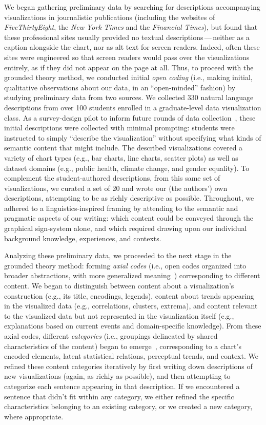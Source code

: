 We began gathering preliminary data by searching for descriptions accompanying visualizations in journalistic publications (including the websites of \emph{FiveThirtyEight}, the \emph{New York Times} and the \emph{Financial Times}), but found that these professional sites usually provided no textual descriptions\,---\,neither as a caption alongside the chart, nor as alt text for screen readers.
Indeed, often these sites were engineered so that screen readers would pass over the visualizations entirely, as if they did not appear on the page at all.
Thus, to proceed with the grounded theory method, we conducted initial \emph{open coding} (i.e., making initial, qualitative observations about our data, in an  ``open-minded'' fashion) by studying preliminary data from two sources.
We collected 330 natural language descriptions from over 100 students enrolled in a graduate-level data visualization class.
As a survey-design pilot to inform future rounds of data collection~, these initial descriptions were collected with minimal prompting: students were instructed to simply ``describe the visualization'' without specifying what kinds of semantic content that might include.
The described visualizations covered a variety of chart types (e.g., bar charts, line charts, scatter plots) as well as dataset domains (e.g., public health, climate change, and gender equality).
To complement the student-authored descriptions, from this same set of visualizations, we curated a set of 20 and wrote our (the authors') own descriptions, attempting to be as richly descriptive as possible.
Throughout, we adhered to a linguistics-inspired framing by attending to the semantic and pragmatic aspects of our writing: which content could be conveyed through the graphical sign-system alone, and which required drawing upon our individual background knowledge, experiences, and contexts.

Analyzing these preliminary data, we proceeded to the next stage in the grounded theory method: forming \emph{axial codes} (i.e., open codes organized into broader abstractions, with more generalized meaning~\cite{olson_curiosity_2014}) corresponding to different content. We began to distinguish between content about a visualization’s construction (e.g., its title, encodings, legends), content about trends appearing in the visualized data (e.g., correlations, clusters, extrema), and content relevant to the visualized data but not represented in the visualization itself (e.g., explanations based on current events and domain-specific knowledge).
From these axial codes, different \emph{categories} (i.e., groupings delineated by shared characteristics of the content) began to emerge~\cite{olson_curiosity_2014}, corresponding to a chart's encoded elements, latent statistical relations, perceptual trends, and context.
We refined these content categories iteratively by first writing down descriptions of new visualizations (again, as richly as possible), and then attempting to categorize each sentence appearing in that description.
If we encountered a sentence that didn't fit within any category, we either refined the specific characteristics belonging to an existing category, or we created a new category, where appropriate.

